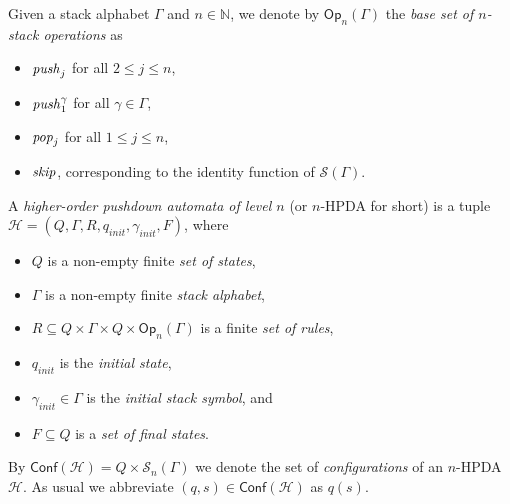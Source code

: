 \documentclass[a4paper,UKenglish,cleveref, autoref, thm-restate]{lipics-v2021}
\renewcommand{\H}{\mathcal{H}}
\newcommand{\N}{\mathbb{N}}
\newcommand{\Conf}{\mathsf{Conf}}
\newcommand{\Op}{\mathsf{Op}}
\begin{document}
Given a stack alphabet $\Gamma$ and $n \in \N$, 
we denote by  $\Op_n(\Gamma)$ the {\em base set of $n$-stack operations} as

\begin{itemize}
\item $\text{\textit{push}}_j$ for all $2 \leq j \leq n$,

\item $\text{\textit{push}}_1^\gamma$ for all $\gamma \in \Gamma$,

\item $\text{\textit{pop}}_j$ for all $1 \leq j \leq n$,

\item $\text{\textit{skip}}$, corresponding to the identity function of $\mathscr{S}(\Gamma)$.

\end{itemize}




\begin{samepage}
\par\noindent\ignorespacesafterend
A {\em higher-order pushdown automata of level $n$} (or $n$-HPDA for short) 
is a tuple $\H=(Q, \Gamma, R, q_{init}, \gamma_{init}, F)$,
where 
\begin{itemize}
        \item $Q$ is a non-empty finite {\em set of  states},
        \item $\Gamma$ is a non-empty finite {\em  stack alphabet},
	\item $R\subseteq Q\times \Gamma \times Q \times \Op_n(\Gamma)$ is a finite {\em set of  rules},
        \item $q_{init}$ is the {\em initial  state},
        \item $\gamma_{init} \in \Gamma$ is the {\em %
initial stack symbol}, and
	\item $F\subseteq Q$ is a {\em set of final  states}.
		\end{itemize}
\end{samepage}

\par\noindent\ignorespacesafterend
By $\Conf(\mathcal{H}) = Q \times \mathscr{S}_n(\Gamma)$
we denote the set of {\em configurations} of an $n$-HPDA $\H$. 
As usual we abbreviate $(q,s) \in \Conf(\mathcal{H})$ as $q(s)$.
\end{document}

